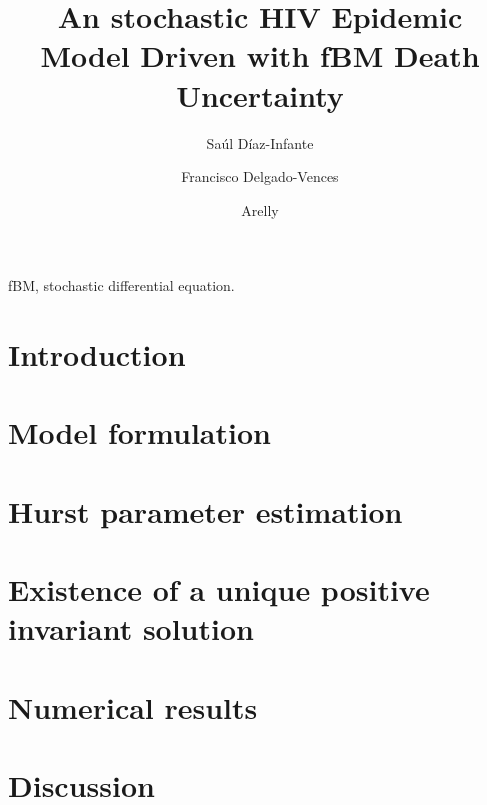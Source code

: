 \documentclass[3p,sort&compress,times]{elsarticle}
\DeclareRobustCommand{\1}[1]{\ensuremath \mathbbm{1}_{\{#1\}}}
\begin{document}
  \begin{frontmatter}
     \author[add:conacyt_unison]{%
      Sa\'ul D\'iaz-Infante
    }%
    \author[add:conacyt_unam]{%
      Francisco Delgado-Vences
    }%
    \author[add:institution]{%
      Arelly 
    }%
    \address[add:conacyt_unison]{
      CONACYT-Universidad de Sonora, Departamento de Matem\'aticas, Boulevard
      Luis Encinas y Rosales S/N, Col. Centro, Hermosillo, Sonora, 
      M\'exico.
    }
    \address[add:conacyt_unam]{
      CONACYT-UNAM, Instituto de Matem\'aticas, Sede
      Oaxaca, M\'exico.
    }
  \title{An stochastic HIV Epidemic Model Driven with fBM Death Uncertainty}
  \begin{abstract}
  \end{abstract}%
  \begin{keyword}
    fBM, stochastic differential equation.
  \end{keyword}
\end{frontmatter}
  \section{Introduction} 
    \label{sec:intro}
  \section{Model formulation} 
    \label{sec:model_formulation}
    
  \section{Hurst parameter estimation}
    \label{sec:hurst_parameter}
  \section{Existence of a unique positive invariant solution} 
    \label{sec:existence}
  \section{Numerical results} 
    \label{sec:numerical_results}
  \section{Discussion}
  \nocite{*}
   
  
\end{document}
